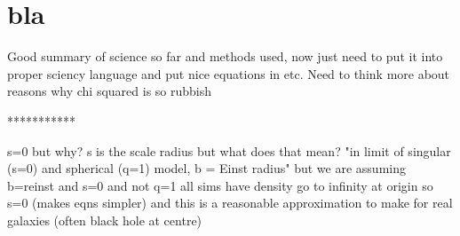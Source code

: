 \documentclass{article}
\begin{document}
\section{bla}
Good summary of science so far and methods used, now just need to put it into proper sciency language and put nice equations in etc. Need to think more about reasons why chi squared is so rubbish

***********


s=0 but why? s is the scale radius but what does that mean?
"in limit of singular (s=0) and spherical (q=1) model, b = Einst radius"
but we are assuming b=reinst and s=0 and not q=1
    all sims have density go to infinity at origin so s=0 (makes eqns simpler) and this is a reasonable approximation to make for real galaxies (often black hole at centre)
    
\end{document}

